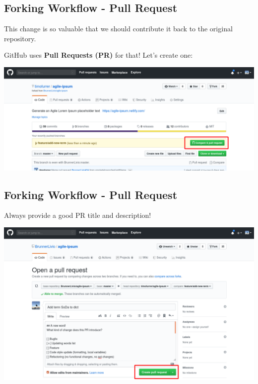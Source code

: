 \subsection{Forking Workflow - Pull Request}
\begin{frame}[fragile]
  \subslidetitle

  This change is so valuable that we should contribute it back to the original repository.

  \vspace{1em}
    GitHub uses \textbf{Pull Requests (PR)} for that! Let's create one:

  \vspace{1em}
  \centerline{\includegraphics[width=\textwidth]{../assets/images/github-pull-request-create.png}}

\end{frame}

\subsection{Forking Workflow - Pull Request}
\begin{frame}[fragile]
  \subslidetitle

  Always provide a good PR title and description!

  \vspace{1em}
  \centerline{\includegraphics[width=\textwidth]{../assets/images/github-pull-request-submit.png}}

\end{frame}

